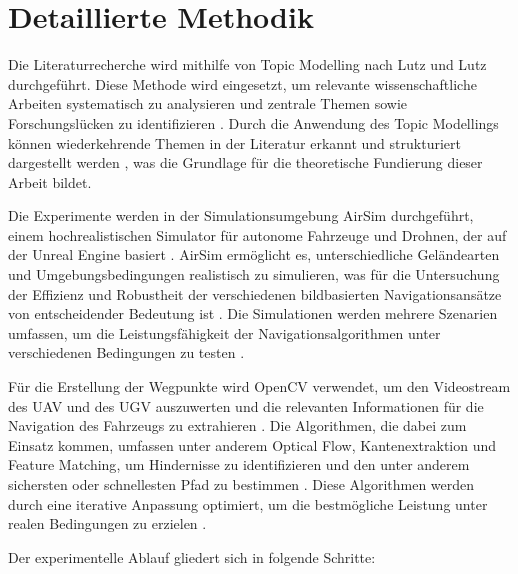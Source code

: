 
\section{Detaillierte Methodik}

Die Literaturrecherche wird mithilfe von Topic Modelling nach Lutz und Lutz durchgeführt. 
Diese Methode wird eingesetzt, um relevante wissenschaftliche Arbeiten systematisch zu analysieren und zentrale Themen sowie Forschungslücken zu identifizieren \cite{Lutz2023TopicMA}. 
Durch die Anwendung des Topic Modellings können wiederkehrende Themen in der Literatur erkannt und strukturiert dargestellt werden \cite{Lutz2023TopicMA}, was die Grundlage für die theoretische Fundierung dieser Arbeit bildet.

Die Experimente werden in der Simulationsumgebung \gls{AirSim} durchgeführt, einem hochrealistischen Simulator für autonome Fahrzeuge und Drohnen, der auf der \gls{Unreal Engine} basiert \cite{airsim2017fsr}. 
\gls{AirSim} ermöglicht es, unterschiedliche Geländearten und Umgebungsbedingungen realistisch zu simulieren, was für die Untersuchung der Effizienz und Robustheit der verschiedenen bildbasierten Navigationsansätze von entscheidender Bedeutung ist \cite{mapless:ugv:navigation}. 
Die Simulationen werden mehrere Szenarien umfassen, um die Leistungsfähigkeit der Navigationsalgorithmen unter verschiedenen Bedingungen zu testen \cite{multi:objective:ugv:navigation}.

Für die Erstellung der Wegpunkte wird \gls{OpenCV} verwendet, um den Videostream des \ac{UAV} und des \ac{UGV} auszuwerten und die relevanten Informationen für die Navigation des Fahrzeugs zu extrahieren \cite{autonomous:flight:uwb:positioning}. 
Die Algorithmen, die dabei zum Einsatz kommen, umfassen unter anderem Optical Flow, Kantenextraktion und \gls{Feature Matching}, um Hindernisse zu identifizieren und den unter anderem sichersten oder schnellesten Pfad zu bestimmen \cite{image:processing:uav:autonomous}. 
Diese Algorithmen werden durch eine iterative Anpassung optimiert, um die bestmögliche Leistung unter realen Bedingungen zu erzielen \cite{ugv:coverage:energy:efficient}.

Der experimentelle Ablauf gliedert sich in folgende Schritte:

